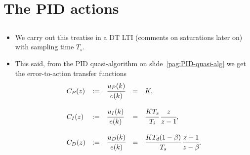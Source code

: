 \section{The PID actions}
\subsection{}

\begin{frame}
\framesubtitleTC{}
\myPause
 \begin{itemize}[<+-| alert@+>]
 \item We carry out this treatise in a DT LTI (comments on saturations later on) with sampling time $T_s$.
 \item This said, from the PID quasi-algorithm on slide~\ref{pag:PID-quasi-alg} we get the error-to-action
       transfer functions
       \begin{displaymath}
        \begin{array}{lclcl}
         C_P(z) &:=& \cfrac{u_P(k)}{e(k)} &=& K, \\ \\
         C_I(z) &:=& \cfrac{u_I(k)}{e(k)} &=& \cfrac{KT_s}{T_i} \, \cfrac{z}{z-1}, \\ \\
         C_D(z) &:=& \cfrac{u_D(k)}{e(k)} &=& \cfrac{KT_d(1-\beta)}{T_s} \, \cfrac{z-1}{z-\beta}.
        \end{array}
       \end{displaymath}
 \end{itemize}
\end{frame}

